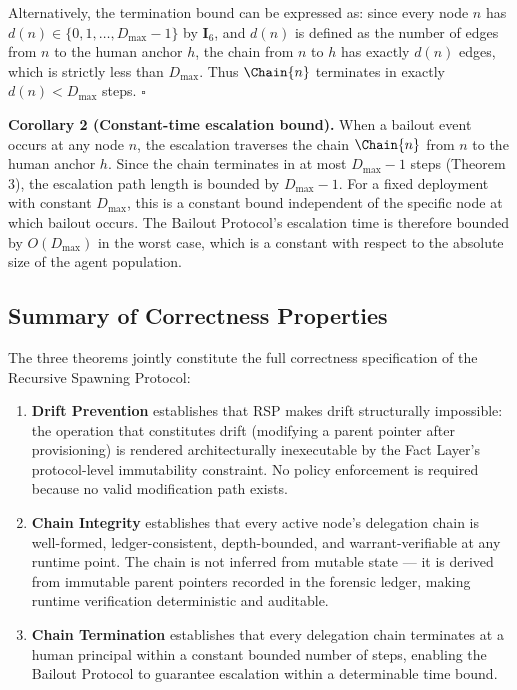 Alternatively, the termination bound can be expressed as: since every node $n$ has $d(n) \in \{0, 1, \dots, D_{\max} - 1\}$ by $\textbf{I}_6$, and $d(n)$ is defined as the number of edges from $n$ to the human anchor $h$, the chain from $n$ to $h$ has exactly $d(n)$ edges, which is strictly less than $D_{\max}$. Thus $\Chain{n}$ terminates in exactly $d(n) < D_{\max}$ steps. $\square$

\bigskip
\noindent\textbf{Corollary 2 (Constant-time escalation bound).} When a bailout event occurs at any node $n$, the escalation traverses the chain $\Chain{n}$ from $n$ to the human anchor $h$. Since the chain terminates in at most $D_{\max} - 1$ steps (Theorem 3), the escalation path length is bounded by $D_{\max} - 1$. For a fixed deployment with constant $D_{\max}$, this is a constant bound independent of the specific node at which bailout occurs. The Bailout Protocol's escalation time is therefore bounded by $O(D_{\max})$ in the worst case, which is a constant with respect to the absolute size of the agent population.

\subsection{Summary of Correctness Properties}
\label{sec:correctness-summary}

The three theorems jointly constitute the full correctness specification of the Recursive Spawning Protocol:

\begin{enumerate}
\item \textbf{Drift Prevention} establishes that RSP makes drift structurally impossible: the operation that constitutes drift (modifying a parent pointer after provisioning) is rendered architecturally inexecutable by the Fact Layer's protocol-level immutability constraint. No policy enforcement is required because no valid modification path exists.

\item \textbf{Chain Integrity} establishes that every active node's delegation chain is well-formed, ledger-consistent, depth-bounded, and warrant-verifiable at any runtime point. The chain is not inferred from mutable state — it is derived from immutable parent pointers recorded in the forensic ledger, making runtime verification deterministic and auditable.

\item \textbf{Chain Termination} establishes that every delegation chain terminates at a human principal within a constant bounded number of steps, enabling the Bailout Protocol to guarantee escalation within a determinable time bound.
\end{enumerate}

